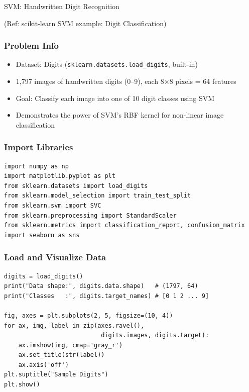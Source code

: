 \begin{frame}[fragile]\frametitle{}
\begin{center}
{\Large SVM: Handwritten Digit Recognition}

{\tiny (Ref: scikit-learn SVM example: Digit Classification)}
\end{center}
\end{frame}

\begin{frame}[fragile]\frametitle{Problem Info}
\begin{itemize}
\item Dataset: Digits (\texttt{sklearn.datasets.load\_digits}, built-in)
\item 1,797 images of handwritten digits (0--9), each 8$\times$8 pixels = 64 features
\item Goal: Classify each image into one of 10 digit classes using SVM
\item Demonstrates the power of SVM's RBF kernel for non-linear image classification
\end{itemize}
\end{frame}

\begin{frame}[fragile]\frametitle{Import Libraries}
\begin{lstlisting}
import numpy as np
import matplotlib.pyplot as plt
from sklearn.datasets import load_digits
from sklearn.model_selection import train_test_split
from sklearn.svm import SVC
from sklearn.preprocessing import StandardScaler
from sklearn.metrics import classification_report, confusion_matrix
import seaborn as sns
\end{lstlisting}
\end{frame}

\begin{frame}[fragile]\frametitle{Load and Visualize Data}
\begin{lstlisting}
digits = load_digits()
print("Data shape:", digits.data.shape)   # (1797, 64)
print("Classes   :", digits.target_names) # [0 1 2 ... 9]

fig, axes = plt.subplots(2, 5, figsize=(10, 4))
for ax, img, label in zip(axes.ravel(),
                           digits.images, digits.target):
    ax.imshow(img, cmap='gray_r')
    ax.set_title(str(label))
    ax.axis('off')
plt.suptitle("Sample Digits")
plt.show()
\end{lstlisting}
\end{frame}

